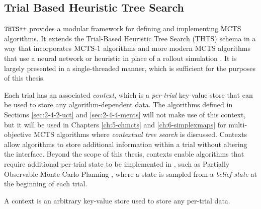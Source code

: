 \subsection{Trial Based Heuristic Tree Search}
\label{sec:2-4-2-thts}

    ${\textnormal{\texttt{THTS++}}}$ \cite{thtspp} provides a modular framework for defining and implementing MCTS algorithms. It extends the Trial-Based Heuristic Tree Search (THTS) schema \cite{thts} in a way that incorporates ${\textnormal{MCTS-1}}$ algorithms and more modern MCTS algorithms that use a neural network or heuristic in place of a rollout simulation \cite{alpha_go,alpha_go_zero}. It is largely presented in a single-threaded manner, which is sufficient for the purposes of this thesis.

    Each trial has an associated \textit{context}, which is a \textit{per-trial} key-value store that can be used to store any algorithm-dependent data. The algorithms defined in Sections \ref{sec:2-4-2-uct} and \ref{sec:2-4-4-ments} will not make use of this context, but it will be used in Chapters \ref{ch:5-chmcts} and \ref{ch:6-simplexmaps} for multi-objective MCTS algorithms where \textit{contextual tree search} is discussed. Contexts allow algorithms to store additional information within a trial without altering the interface. Beyond the scope of this thesis, contexts enable algorithms that require additional per-trial state to be implemented in \thtspp, such as Partially Observable Monte Carlo Planning \cite{pomcp}, where a state is sampled from a \textit{belief state} at the beginning of each trial.
    \begin{defn}
        \label{def:2:thts_context}
        A \textnormal{context} is an arbitrary key-value store used to store any per-trial data.
    \end{defn}  

